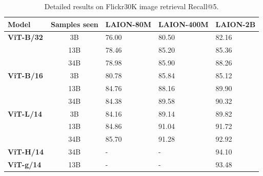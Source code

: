 \begin{appendix}
\begin{table}[tb]
\small
\centering
\begin{tabular}{@{}lclll@{}}
\toprule
\textbf{Model}                     & \textbf{Samples seen} & \textbf{LAION-80M} & \textbf{LAION-400M} & \textbf{LAION-2B} \\ \midrule
\textbf{ViT-B/32} & 3B           & 76.00     & 80.50      & 82.16       \\
                          & 13B          & 78.46     & 85.20       & 85.36       \\
                          & 34B          & 78.98         & 85.90      &88.26        \\ \midrule
\textbf{ViT-B/16} & 3B           & 80.78     & 85.84      & 85.12       \\
                          & 13B          & 84.76     & 88.16       & 89.90       \\
                          & 34B          & 84.38         & 89.58      & 90.32        \\ \midrule                          
\textbf{ViT-L/14} & 3B           & 84.16     & 89.14      & 89.82       \\         
& 13B          & 84.86         & 91.04      & 91.72           \\
                          & 34B          & 85.70         & 91.28       & 92.92       \\ \midrule 
\textbf{ViT-H/14} & 34B           & -     & -      & 94.10       \\         \midrule 
\textbf{ViT-g/14} & 13B           & -     & -      & 93.48       \\         \bottomrule 

\end{tabular}




\caption{Detailed results on Flickr30K image retrieval Recall@5.
}
\label{table:zeroshot_flickr30k_image_retrieval}
\end{table}

\begin{table}[tb]


\end{table}
\end{appendix}
